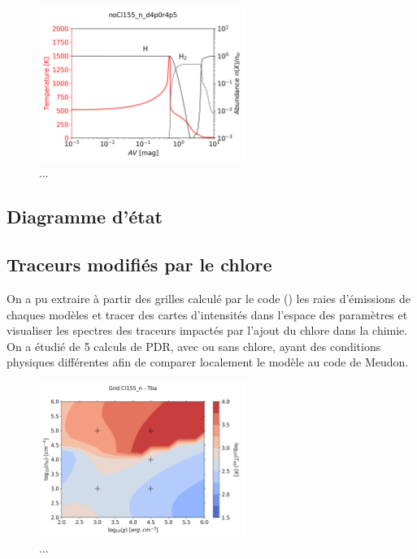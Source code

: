 \begin{figure}[!htbp]
    \centering
        \centering \includegraphics[trim = {0 0 0 1.5cm},clip,width=0.6\textwidth]{figure/Cl/grid/profil_H.png}
        \caption{...}
    \label{fig:Cl:grid:proH}
\end{figure}

\subsection{Diagramme d'état}

\subsection{Traceurs modifiés par le chlore}

On a pu extraire à partir des grilles calculé par le code (\uncinq) les raies d'émissions de chaques modèles et tracer des cartes d'intensités dans l'espace des paramètres et visualiser les spectres des traceurs impactés par l'ajout du chlore dans la chimie. On a étudié de 5 calculs de PDR, avec ou sans chlore, ayant des conditions physiques différentes afin de comparer localement le modèle au code de Meudon. 

\begin{figure}[!htbp]
    \centering
        \centering \includegraphics[trim = {0 0 0 1.5cm},clip,width=0.6\textwidth]{figure/Cl/grid/mapT_cross.png}
        \caption{...}
\end{figure}

